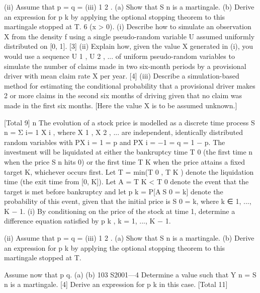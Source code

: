 \documentclass[a4paper,12pt]{article}
\begin{document}
\begin{enumerate}
(ii) Assume that p = q =
(iii)
1
2
.
(a) Show that S n is a martingale.
(b) Derive an expression for p k by applying the optional stopping
theorem to this martingale stopped at T.
6
(x > 0).
(i) Describe how to simulate an observation X from the density f using a
single pseudo-random variable U assumed uniformly distributed on [0, 1].
[3]
(ii) Explain how, given the value X generated in (i), you would use a sequence
U 1 , U 2 , ... of uniform pseudo-random variables to simulate the number of
claims made in two six-month periods by a provisional driver with mean
claim rate X per year.
[4]
(iii) Describe a simulation-based method for estimating the conditional
probability that a provisional driver makes 2 or more claims in the second
six months of driving given that no claim was made in the first six
months. [Here the value X is to be assumed unknown.]

[Total 9]
n
The evolution of a stock price is modelled as a discrete time process S n = Σ i=
1 X i ,
where X 1 , X 2 , ... are independent, identically distributed random variables with
P{X i = 1} = p and P{X i = −1} = q = 1 − p. The investment will be liquidated at
either the bankruptcy time T 0 (the first time n when the price S n hits 0) or the
first time T K when the price attains a fixed target K, whichever occurs first.
Let T = min(T 0 , T K ) denote the liquidation time (the exit time from [0, K]). Let
A = {T K < T 0 } denote the event that the target is met before bankruptcy and let
p k = P[AS 0 = k] denote the probability of this event, given that the initial price is
S 0 = k, where k ∈ {1, ..., K − 1}.
(i) By conditioning on the price of the stock at time 1, determine a difference
equation satisfied by p k , k = 1, ..., K − 1.

(ii) Assume that p = q =
(iii)
1
2
.
(a) Show that S n is a martingale.
(b) Derive an expression for p k by applying the optional stopping
theorem to this martingale stopped at T.


Assume now that p \neq q.
(a)
(b)
103 S2001—4
Determine a value \theta {} such that Y n = \theta S n is a martingale.
[4]
Derive an expression for p k in this case.
[Total 11]


\end{enumerate}
\end{document}
